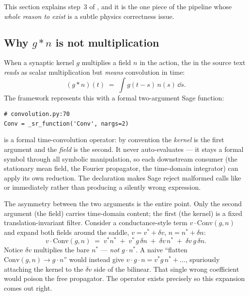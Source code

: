 This section explains step~3 of , and it is the one piece of the
pipeline whose \emph{whole reason to exist} is a subtle physics correctness issue.

\subsection{Why \texorpdfstring{$g \ast n$}{g*n} is not multiplication}

When a synaptic kernel $g$ multiplies a field $n$ in the action, the \code{*} in
the source text \emph{reads} as scalar multiplication but \emph{means} convolution
in time:
\[
  (g \ast n)(t) \;=\; \int g(t-s)\,n(s)\,\dd s.
\]
The framework represents this with a formal two-argument Sage function:

\begin{lstlisting}
# convolution.py:70
Conv = _sr_function('Conv', nargs=2)
\end{lstlisting}

\begin{defn}
 is a formal time-convolution operator: by convention the
\emph{kernel} is the first argument and the \emph{field} is the second. It never
auto-evaluates --- it stays a formal symbol through all symbolic manipulation, so
each downstream consumer (the stationary mean field, the Fourier propagator, the
time-domain integrator) can apply its own reduction. The  declaration
makes Sage reject malformed calls like  or 
immediately rather than producing a silently wrong expression.
\end{defn}

The asymmetry between the two arguments is the entire point. Only the second
argument (the field) carries time-domain content; the first (the kernel) is a
fixed translation-invariant filter. Consider a conductance-style term
$v\cdot\mathrm{Conv}(g,n)$ and expand both fields around the saddle,
$v=v^{*}+\delta v$, $n=n^{*}+\delta n$:
\[
  v\cdot\mathrm{Conv}(g,n)
  \;=\; v^{*}n^{*} \;+\; v^{*}\,g\,\delta n \;+\; \delta v\,n^{*} \;+\; \delta v\,g\,\delta n.
\]
Notice $\delta v$ multiplies the bare $n^{*}$ --- \emph{not} $g\cdot n^{*}$. A naive
``flatten $\mathrm{Conv}(g,n)\to g\cdot n$'' would instead give
$v\cdot g\cdot n = v^{*}g\,n^{*}+\dots$, spuriously attaching the kernel to the
$\delta v$ side of the bilinear. That single wrong coefficient would poison the free
propagator. The  operator exists precisely so this expansion comes out
right.

